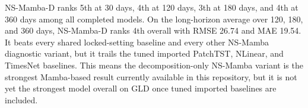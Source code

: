 NS-Mamba-D ranks 5th at 30 days, 4th at 120 days, 3th at 180 days, and 4th at 360 days among all completed models.
On the long-horizon average over 120, 180, and 360 days, NS-Mamba-D ranks 4th overall with RMSE 26.74 and MAE 19.54.
It beats every shared locked-setting baseline and every other NS-Mamba diagnostic variant, but it trails the tuned imported PatchTST, NLinear, and TimesNet baselines.
This means the decomposition-only NS-Mamba variant is the strongest Mamba-based result currently available in this repository, but it is not yet the strongest model overall on GLD once tuned imported baselines are included.
